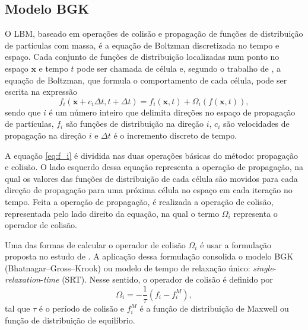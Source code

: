 \subsection{Modelo BGK}

O LBM, baseado em operações de colisão e propagação de funções de distribuição de partículas com massa, é a equação de Boltzman discretizada no tempo e espaço. Cada conjunto de funções de distribuição localizadas num ponto no espaço $\textbf{x}$ e tempo $t$ pode ser chamada de célula e, segundo o trabalho de , a equação de Boltzman, que formula o comportamento de cada célula, pode ser escrita na expressão 
\begin{equation}
	f_{i}(\textbf{x} + c_{i}\Delta t, t + \Delta t) = f_{i}(\textbf{x}, t) + \Omega_{i}(f(\textbf{x}, t)),
    \label{eq:f_i}
\end{equation}
sendo que $i$ é um número inteiro que delimita direções no espaço de propagação de partículas, $f_{i}$ são funções de distribuição na direção $i$, $c_{i}$ são velocidades de propagação na direção $i$ e $\Delta t$ é o incremento discreto de tempo. 

A equação \ref{eq:f_i} é dividida nas duas operações básicas do método: propagação e colisão. O lado esquerdo dessa equação representa a operação de propagação, na qual os valores das funções de distribuição de cada célula são movidos para cada direção de propagação para uma próxima célula no espaço em cada iteração no tempo. Feita a operação de propagação, é realizada a operação de colisão, representada pelo lado direito da equação, na qual o termo $\Omega_{i}$ representa o operador de colisão.

Uma das formas de calcular o operador de colisão $\Omega_{i}$ é usar a formulação proposta no estudo de . A aplicação dessa formulação consolida o modelo BGK (Bhatnagar–Gross–Krook) ou modelo de tempo de relaxação único: \textit{single}-\textit{relaxation}-\textit{time} (SRT). Nesse sentido, o operador de colisão é definido por
\begin{equation}
	\Omega_{i} = -\frac{1}{\tau}(f_{i} - f_{i}^{M}),
    \label{eq:omega_i}
\end{equation}
tal que $\tau$ é o período de colisão e $f_{i}^{M}$ é a função de distribuição de Maxwell ou função de distribuição de equilíbrio.

